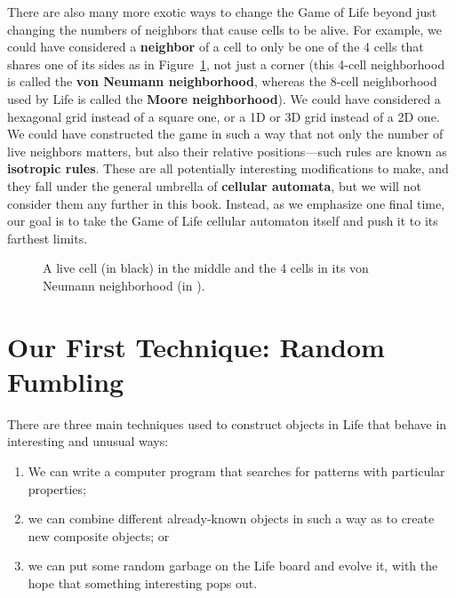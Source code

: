 There are also many more exotic ways to change the Game of Life beyond just changing the numbers of neighbors that cause cells to be alive. For example, we could have considered a \textbf{neighbor} of a cell to only be one of the 4 cells that shares one of its sides as in Figure~\ref{fig:vn_neighborhood}, not just a corner (this 4-cell neighborhood is called the \textbf{von Neumann neighborhood}, whereas the 8-cell neighborhood used by Life is called the \textbf{Moore neighborhood}). We could have considered a hexagonal grid instead of a square one, or a 1D or 3D grid instead of a 2D one. We could have constructed the game in such a way that not only the number of live neighbors matters, but also their relative positions---such rules are known as \textbf{isotropic rules}. These are all potentially interesting modifications to make, and they fall under the general umbrella of \textbf{cellular automata}, but we will not consider them any further in this book. Instead, as we emphasize one final time, our goal is to take the Game of Life cellular automaton itself and push it to its farthest limits.

\begin{figure}[!htb]
	\centering
	\caption{A live cell (in black) in the middle and the 4 cells in its von Neumann neighborhood (in ).}\label{fig:vn_neighborhood}
\end{figure}


\section{Our First Technique: Random Fumbling}\label{sec:fumbling}

There are three main techniques used to construct objects in Life that behave in interesting and unusual ways:\smallskip

\begin{enumerate}
	\item[1)] We can write a computer program that searches for patterns with particular properties;\smallskip
	
	\item[2)] we can combine different already-known objects in such a way as to create new composite objects; or\smallskip
	
	\item[3)] we can put some random garbage on the Life board and evolve it, with the hope that something interesting pops out.\smallskip
\end{enumerate}

